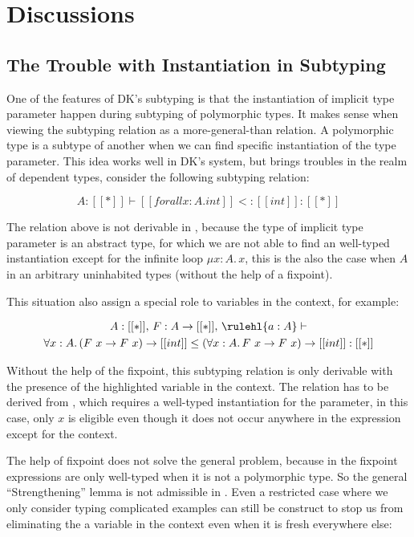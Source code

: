 \section{Discussions}

\subsection{The Trouble with Instantiation in Subtyping}
\label{sec:instantiation}

One of the features of DK's subtyping is that the instantiation of implicit type
parameter happen during subtyping of polymorphic types. It makes sense when
viewing the subtyping relation as a more-general-than relation. A polymorphic
type is a subtype of another when we can find specific instantiation of the
type parameter. This idea works well in DK's system, but brings troubles
in the realm of dependent types, consider the following subtyping relation:

\begin{equation*}
    A : [[*]] \vdash [[forall x : A. int]] <: [[int]] : [[*]]
\end{equation*}

The relation above is not derivable in \name, because the type of implicit type
parameter is an abstract type, for which we are not able to find an well-typed
instantiation except for the infinite loop $\mu x : A.\, x$, this is the also the
case when $A$ in an arbitrary uninhabited types (without the help of a fixpoint).

This situation also assign a special role to variables in the context,
for example:

\begin{multline*}
    A : [[*]],\, F : A \rightarrow [[*]],\, \rulehl{a : A} \vdash \\
    \forall x : A.\, (F~x \rightarrow F~x) \rightarrow [[int]] \le (\forall x : A.\, F~x \rightarrow F~x) \rightarrow [[int]] : [[*]]
\end{multline*}

Without the help of the fixpoint, this subtyping relation is only derivable
with the presence of the highlighted variable in the context. The relation has to
be derived from , which requires a well-typed instantiation for
the parameter, in this case, only $x$ is eligible even though it does not occur
anywhere in the expression except for the context.

The help of fixpoint does not solve the general problem, because
in \name the fixpoint expressions are only well-typed when it is not a polymorphic
type. So the general ``Strengthening'' lemma is not admissible in \name. Even
a restricted case where we only consider typing complicated examples can still
be construct to stop us from eliminating the a variable in the context even
when it is fresh everywhere else:

